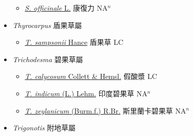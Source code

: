 \begin{itemize}
  \begin{itemize}
        \item[] \href{http://www.theplantlist.org/tpl1.1/search?q=Symphytum+officinale}{\textit{S. officinale} L.}   康復力 NA$^n$
  \end{itemize}
 \item[] \textit{Thyrocarpus} 盾果草屬
                    
  \begin{itemize}
        \item[] \href{http://www.theplantlist.org/tpl1.1/search?q=Thyrocarpus+sampsonii}{\textit{T. sampsonii} Hance}   盾果草 LC
  \end{itemize}
 \item[] \textit{Trichodesma} 碧果草屬
                    
  \begin{itemize}
        \item[] \href{http://www.theplantlist.org/tpl1.1/search?q=Trichodesma+calycosum}{\textit{T. calycosum} Collett \& Hemsl.}   假酸漿 LC
        \item[] \href{http://www.theplantlist.org/tpl1.1/search?q=Trichodesma+indicum}{\textit{T. indicum} (L.) Lehm.}   印度碧果草 NA$^n$
        \item[] \href{http://www.theplantlist.org/tpl1.1/search?q=Trichodesma+zeylanicum}{\textit{T. zeylanicum} (Burm.f.) R.Br.}   斯里蘭卡碧果草 NA$^n$
  \end{itemize}
 \item[] \textit{Trigonotis} 附地草屬
                    

\end{itemize}
